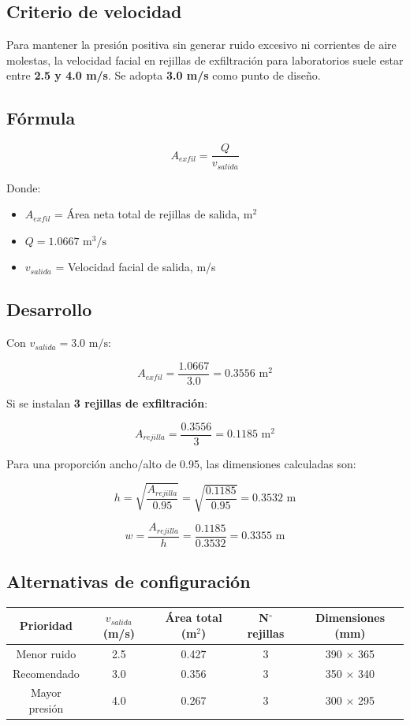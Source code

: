 \documentclass[12pt,a4paper]{article}
\begin{document}
\subsection{Criterio de velocidad}

Para mantener la presión positiva sin generar ruido excesivo ni corrientes de aire molestas, la velocidad facial en rejillas de exfiltración para laboratorios suele estar entre \textbf{2.5 y 4.0 m/s}. Se adopta \textbf{3.0 m/s} como punto de diseño.

\subsection{Fórmula}

\[
A_{exfil} = \frac{Q}{v_{salida}}
\]

Donde:
\begin{itemize}[leftmargin=*]
    \item $A_{exfil}$ = Área neta total de rejillas de salida, m$^2$
    \item $Q = 1.0667 \text{ m}^3/\text{s}$
    \item $v_{salida}$ = Velocidad facial de salida, m/s
\end{itemize}

\subsection{Desarrollo}

Con $v_{salida} = 3.0 \text{ m/s}$:

\[
A_{exfil} = \frac{1.0667}{3.0} = 0.3556 \text{ m}^2
\]

Si se instalan \textbf{3 rejillas de exfiltración}:

\[
A_{rejilla} = \frac{0.3556}{3} = 0.1185 \text{ m}^2
\]

Para una proporción ancho/alto de 0.95, las dimensiones calculadas son:

\[
h = \sqrt{\frac{A_{rejilla}}{0.95}} = \sqrt{\frac{0.1185}{0.95}} = 0.3532 \text{ m}
\]

\[
w = \frac{A_{rejilla}}{h} = \frac{0.1185}{0.3532} = 0.3355 \text{ m}
\]

\subsection{Alternativas de configuración}

\begin{table}[h!]
\centering
{}
\begin{tabular}{@{}ccccc@{}}
\toprule
\textbf{Prioridad} & \textbf{$v_{salida}$ (m/s)} & \textbf{Área total (m$^2$)} & \textbf{N$^\circ$ rejillas} & \textbf{Dimensiones (mm)} \\
\midrule
Menor ruido & 2.5 & 0.427 & 3 & 390 $\times$ 365 \\
Recomendado & 3.0 & 0.356 & 3 & 350 $\times$ 340 \\
Mayor presión & 4.0 & 0.267 & 3 & 300 $\times$ 295 \\
\bottomrule
\end{tabular}
\end{table}
\end{document}
